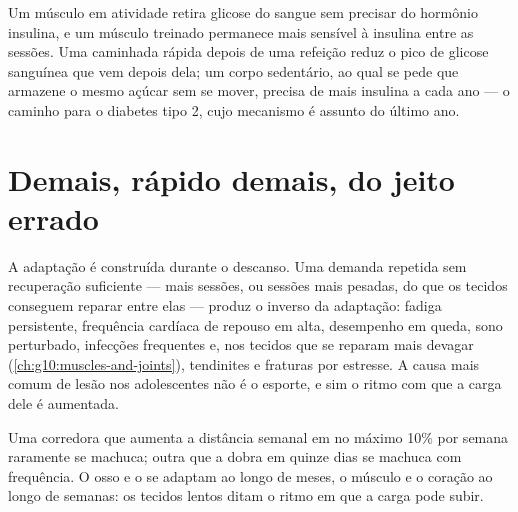\begin{example}\label{ex:g10:sport-and-health:sugar}
Um músculo em atividade retira glicose do sangue sem precisar do
hormônio insulina, e um músculo treinado permanece mais sensível à
insulina entre as sessões. Uma caminhada rápida depois de uma refeição
reduz o pico de glicose sanguínea que vem depois dela; um corpo
sedentário, ao qual se pede que armazene o mesmo açúcar sem se mover,
precisa de mais insulina a cada ano --- o caminho para o diabetes tipo
2, cujo mecanismo é assunto do último ano.
\end{example}

\section{Demais, rápido demais, do jeito errado}

\begin{proposition}\label{prop:g10:sport-and-health:overtraining}
A adaptação é construída durante o descanso. Uma demanda repetida sem
recuperação suficiente --- mais sessões, ou sessões mais pesadas, do
que os tecidos conseguem reparar entre elas --- produz o inverso da
adaptação: fadiga persistente, frequência cardíaca de repouso em alta,
desempenho em queda, sono perturbado, infecções frequentes e, nos
tecidos que se reparam mais devagar
(\cref{ch:g10:muscles-and-joints}), tendinites e fraturas por estresse.
A causa mais comum de lesão nos adolescentes não é o esporte, e sim o
ritmo com que a carga dele é aumentada.
\end{proposition}
\admitted

\begin{example}\label{ex:g10:sport-and-health:tenpercent}
Uma corredora que aumenta a distância semanal em no máximo 10\% por
semana raramente se machuca; outra que a dobra em quinze dias se
machuca com frequência. O osso e o  se adaptam ao longo de meses,
o músculo e o coração ao longo de semanas: os tecidos lentos ditam o
ritmo em que a carga pode subir.
\end{example}

